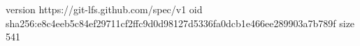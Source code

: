 version https://git-lfs.github.com/spec/v1
oid sha256:e8c4eeb5c84ef29711cf2ffc9d0d98127d5336fa0dcb1e466ee289903a7b789f
size 541
